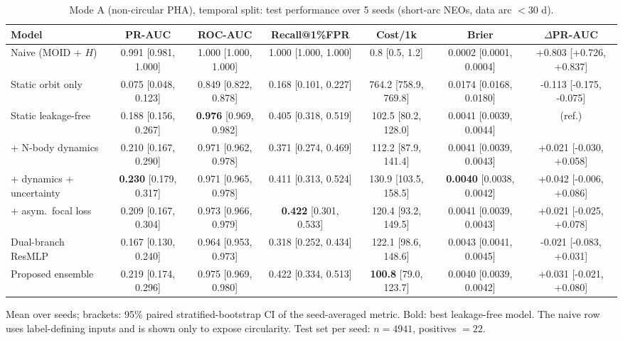 \begin{table}[t]
\centering
\small
\caption{Mode A (non-circular PHA), temporal split: test performance over 5 seeds (short-arc NEOs, data arc $<30$ d).}
\label{tab:pha_temporal_short_arc}
\begin{tabular}{lcccccc}
\toprule
Model & PR-AUC & ROC-AUC & Recall@1\%FPR & Cost/1k & Brier & $\Delta$PR-AUC \\
\midrule
Naive (MOID + $H$) & 0.991 \scriptsize{[0.981, 1.000]} & 1.000 \scriptsize{[1.000, 1.000]} & 1.000 \scriptsize{[1.000, 1.000]} & 0.8 \scriptsize{[0.5, 1.2]} & 0.0002 \scriptsize{[0.0001, 0.0004]} & +0.803 \scriptsize{[+0.726, +0.837]} \\
\midrule
Static orbit only & 0.075 \scriptsize{[0.048, 0.123]} & 0.849 \scriptsize{[0.822, 0.878]} & 0.168 \scriptsize{[0.101, 0.227]} & 764.2 \scriptsize{[758.9, 769.8]} & 0.0174 \scriptsize{[0.0168, 0.0180]} & -0.113 \scriptsize{[-0.175, -0.075]} \\
Static leakage-free & 0.188 \scriptsize{[0.156, 0.267]} & \textbf{0.976} \scriptsize{[0.969, 0.982]} & 0.405 \scriptsize{[0.318, 0.519]} & 102.5 \scriptsize{[80.2, 128.0]} & 0.0041 \scriptsize{[0.0039, 0.0044]} & (ref.) \\
+ N-body dynamics & 0.210 \scriptsize{[0.167, 0.290]} & 0.971 \scriptsize{[0.962, 0.978]} & 0.371 \scriptsize{[0.274, 0.469]} & 112.2 \scriptsize{[87.9, 141.4]} & 0.0041 \scriptsize{[0.0039, 0.0043]} & +0.021 \scriptsize{[-0.030, +0.058]} \\
+ dynamics + uncertainty & \textbf{0.230} \scriptsize{[0.179, 0.317]} & 0.971 \scriptsize{[0.965, 0.978]} & 0.411 \scriptsize{[0.313, 0.524]} & 130.9 \scriptsize{[103.5, 158.5]} & \textbf{0.0040} \scriptsize{[0.0038, 0.0042]} & +0.042 \scriptsize{[-0.006, +0.086]} \\
+ asym.\ focal loss & 0.209 \scriptsize{[0.167, 0.304]} & 0.973 \scriptsize{[0.966, 0.979]} & \textbf{0.422} \scriptsize{[0.301, 0.533]} & 120.4 \scriptsize{[93.2, 149.5]} & 0.0041 \scriptsize{[0.0039, 0.0043]} & +0.021 \scriptsize{[-0.025, +0.078]} \\
Dual-branch ResMLP & 0.167 \scriptsize{[0.130, 0.240]} & 0.964 \scriptsize{[0.953, 0.973]} & 0.318 \scriptsize{[0.252, 0.434]} & 122.1 \scriptsize{[98.6, 148.6]} & 0.0043 \scriptsize{[0.0041, 0.0045]} & -0.021 \scriptsize{[-0.083, +0.031]} \\
Proposed ensemble & 0.219 \scriptsize{[0.174, 0.296]} & 0.975 \scriptsize{[0.969, 0.980]} & 0.422 \scriptsize{[0.334, 0.513]} & \textbf{100.8} \scriptsize{[79.0, 123.7]} & 0.0040 \scriptsize{[0.0039, 0.0042]} & +0.031 \scriptsize{[-0.021, +0.080]} \\
\bottomrule
\end{tabular}
\par\vspace{2pt}\footnotesize Mean over seeds; brackets: 95\% paired stratified-bootstrap CI of the seed-averaged metric. Bold: best leakage-free model. The naive row uses label-defining inputs and is shown only to expose circularity. Test set per seed: $n=4941$, positives $=22$.
\end{table}

